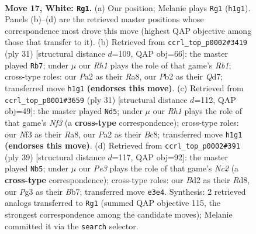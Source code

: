 \documentclass[11pt]{article}
\begin{document}
\clearpage

\begin{figure}[p]\centering
\begin{subfigure}{0.46\textwidth}\centering
\resizebox{\linewidth}{!}{%
\newchessgame
\chessboard[
  setfen={1rbrn1k1/p1p1qpp1/2n5/2PpP2p/1p6/1Q2PNP1/PP1B1P1P/2K1RB1R w - - 1 17},
  showmover=false,
  pgfstyle=straightmove, color=movearrow, markmove={h1-g1}
]}
\caption{}
\end{subfigure}\hfill
\begin{subfigure}{0.46\textwidth}\centering
\resizebox{\linewidth}{!}{%
\newchessgame
\chessboard[
  setfen={rr4k1/3q1pbp/p1bp1np1/1p2p3/1PP1P3/2NP1N1P/5PP1/1RBQR1K1 b - - 1 16},
  showmover=false,
  pgfstyle=straightmove, color=movearrow, markmove={b8-b7}
]}
\caption{}
\end{subfigure}
\\[4pt]
\begin{subfigure}{0.46\textwidth}\centering
\resizebox{\linewidth}{!}{%
\newchessgame
\chessboard[
  setfen={r1bqr1k1/1p3pbp/2p1pnp1/8/p1NP1P2/2N1P3/PPQ2PBP/2RR2K1 b - - 0 16},
  showmover=false,
  pgfstyle=straightmove, color=movearrow, markmove={f6-d5}
]}
\caption{}
\end{subfigure}\hfill
\begin{subfigure}{0.46\textwidth}\centering
\resizebox{\linewidth}{!}{%
\newchessgame
\chessboard[
  setfen={1r1r3k/1bn1qppp/ppp2b2/3p4/QP1P2BP/2N1PNP1/P4P2/R3R1K1 b - - 1 20},
  showmover=false,
  pgfstyle=straightmove, color=movearrow, markmove={c7-b5}
]}
\caption{}
\end{subfigure}
\caption{\textbf{Move 17, White: \texttt{Rg1}.} (a) Our position; Melanie plays \texttt{Rg1} (\texttt{h1g1}). Panels (b)--(d) are the retrieved master positions whose correspondence most drove this move (highest QAP objective among those that transfer to it). (b) Retrieved from \texttt{ccrl\_top\_p0002\#3419} (ply 31) [structural distance $d$=109, QAP obj=66]: the master played \texttt{Rb7}; under $\mu$ our \emph{Rh1} plays the role of that game's \emph{Rb1}; cross-type roles: our \emph{P}a2 as their \emph{R}a8, our \emph{P}b2 as their \emph{Q}d7; transferred move \texttt{h1g1} \textbf{(endorses this move)}. (c) Retrieved from \texttt{ccrl\_top\_p0001\#3659} (ply 31) [structural distance $d$=112, QAP obj=49]: the master played \texttt{Nd5}; under $\mu$ our \emph{Rh1} plays the role of that game's \emph{Nf3} (a \textbf{cross-type} correspondence); cross-type roles: our \emph{N}f3 as their \emph{R}a8, our \emph{P}a2 as their \emph{B}c8; transferred move \texttt{h1g1} \textbf{(endorses this move)}. (d) Retrieved from \texttt{ccrl\_top\_p0002\#391} (ply 39) [structural distance $d$=117, QAP obj=92]: the master played \texttt{Nb5}; under $\mu$ our \emph{Pe3} plays the role of that game's \emph{Nc2} (a \textbf{cross-type} correspondence); cross-type roles: our \emph{B}d2 as their \emph{R}d8, our \emph{P}g3 as their \emph{B}b7; transferred move \texttt{e3e4}. Synthesis: 2 retrieved analogs transferred to \texttt{Rg1} (summed QAP objective 115, the strongest correspondence among the candidate moves); Melanie committed it via the \texttt{search} selector.}
\label{fig:thought-m32}
\end{figure}
\end{document}
